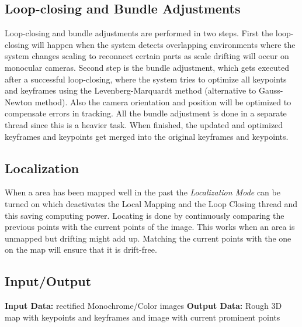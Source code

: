 \subsection{Loop-closing and Bundle Adjustments}
Loop-closing and bundle adjustments are performed in two steps. First the loop-closing will happen when the system detects overlapping environments where the system changes scaling to reconnect certain parts as scale drifting will occur on monocular cameras.\newline
Second step is the bundle adjustment, which gets executed after a successful loop-closing, where the system tries to optimize all keypoints and keyframes using the Levenberg-Marquardt method (alternative to Gauss-Newton method).\cite{LevenbergMarquardMethod} Also the camera orientation and position will be optimized to compensate errors in tracking. All the bundle adjustment is done in a separate thread since this is a heavier task.\newline
When finished, the updated and optimized keyframes and keypoints get merged into the original keyframes and keypoints.\cite{orbslam2}

\subsection {Localization}
When a area has been mapped well in the past the \textit{Localization Mode} can be turned on which deactivates the Local Mapping and the Loop Closing thread and this saving computing power.
Locating is done by continuously comparing the previous points with the current points of the image. This works when an area is unmapped but drifting might add up.
Matching the current points with the one on the map will ensure that it is drift-free.\cite{orbslam2}

\subsection{Input/Output}
\textbf{Input Data:} rectified Monochrome/Color images\newline
\textbf{Output Data:} Rough 3D map with keypoints and keyframes and image with current prominent points